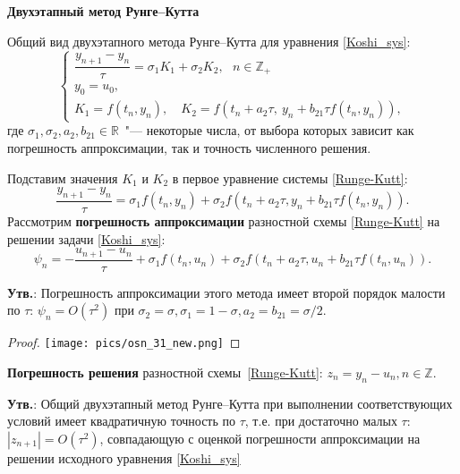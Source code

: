 
\bigbreak

\centerline{\textbf{Двухэтапный метод Рунге--Кутта}}
Общий вид двухэтапного метода Рунге--Кутта для уравнения \eqref{Koshi_sys}:
\begin{equation}
%
    \label{Runge-Kutt}
    \begin{cases}
        \dfrac{y_{n+1} - y_n}{\tau} = \sigma_1 K_1 + \sigma_2 K_2,~~~n\in \mathbb{Z}_+ \\
        y_0 = u_0, \\
        K_1 = f(t_n, y_n), \quad K_2 = f(t_n + a_2\tau, ~ y_n + b_{21} \tau f(t_n, y_n)),
    \end{cases}
%
\end{equation}
где $\sigma_1, \sigma_2,a_{2}, b_{21} \in\mathbb{R}$~"--- некоторые числа, от выбора которых зависит как погрешность аппроксимации, так и точность численного решения.

Подставим значения $K_1$ и $K_2$ в первое уравнение системы \eqref{Runge-Kutt}:
%
$$
    \frac{y_{n+1} - y_n}{\tau} = \sigma_1 f(t_n, y_n) +
    \sigma_2 f(t_n + a_2 \tau, y_n + b_{21} \tau f(t_n, y_n)).
$$
%
Рассмотрим \textbf{погрешность аппроксимации} разностной схемы \eqref{Runge-Kutt}
на решении задачи \eqref{Koshi_sys}:
%
\begin{equation}
%
    \label{Runge-Kutt_appr}
    \psi_n = - \frac{u_{n+1} - u_n}{\tau} + \sigma_1 f(t_n, u_n) +
    \sigma_2 f\left(t_n+a_2\tau, u_n + b_{21}\tau f(t_n, u_n)\right).
%
\end{equation}

\textbf{Утв.}: Погрешность аппроксимации этого метода имеет второй порядок малости по $\tau$: $\psi_n = O(\tau^2)$ при $\sigma_2 = \sigma, \sigma_1 = 1-\sigma, a_2 = b_{21} = \sigma/2$.

\begin{proof}

\texttt{[image: pics/osn\_31\_new.png]}

\end{proof}

\textbf{Погрешность решения} разностной схемы~\eqref{Runge-Kutt}: $z_n = y_n - u_n,  n\in\mathbb{Z}.$

\textbf{Утв.}: Общий двухэтапный метод Рунге--Кутта
при выполнении соответствующих условий
имеет квадратичную точность по $\tau$, т.е. при достаточно малых $\tau$: $|z_{n+1}| = O(\tau^2)$, совпадающую с оценкой погрешности аппроксимации на решении исходного уравнения \eqref{Koshi_sys}

